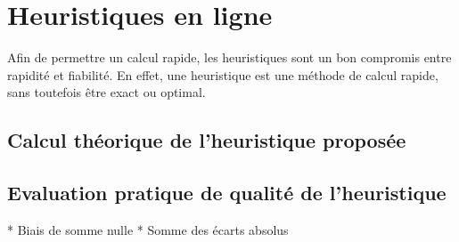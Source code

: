 \section{Heuristiques en ligne}
Afin de permettre un calcul rapide, les heuristiques sont un bon compromis entre rapidité et fiabilité. En effet, une heuristique est une méthode de calcul rapide, sans toutefois être exact ou optimal.

\subsection{Calcul théorique de l'heuristique proposée}

\subsection{Evaluation pratique de qualité de l'heuristique}

* Biais de somme nulle
* Somme des écarts absolus

\pagebreak